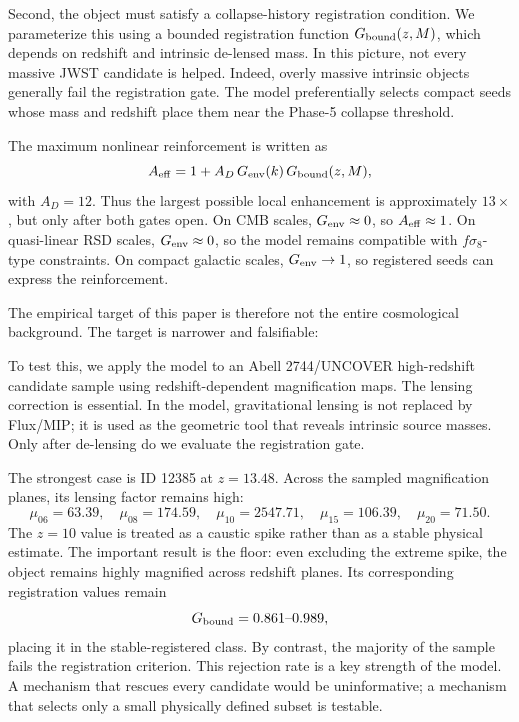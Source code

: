 \documentclass[11pt,a4paper]{article}
\begin{document}
Second, the object must satisfy a collapse-history registration condition. We parameterize this using a bounded registration function $G_{\rm bound}(z,M)$, which depends on redshift and intrinsic de-lensed mass. In this picture, not every massive JWST candidate is helped. Indeed, overly massive intrinsic objects generally fail the registration gate. The model preferentially selects compact seeds whose mass and redshift place them near the Phase-5 collapse threshold.

The maximum nonlinear reinforcement is written as
\begin{equation}
A_{\rm eff}=1+A_D\,G_{\rm env}(k)\,G_{\rm bound}(z,M),
\end{equation}
with $A_D=12$. Thus the largest possible local enhancement is approximately $13\times$, but only after both gates open. On CMB scales, $G_{\rm env}\approx0$, so $A_{\rm eff}\approx1$. On quasi-linear RSD scales, $G_{\rm env}\approx0$, so the model remains compatible with $f\sigma_8$-type constraints. On compact galactic scales, $G_{\rm env}\rightarrow1$, so registered seeds can express the reinforcement.

The empirical target of this paper is therefore not the entire cosmological background. The target is narrower and falsifiable:
\begin{center}
\end{center}

To test this, we apply the model to an Abell 2744/UNCOVER high-redshift candidate sample using redshift-dependent magnification maps. The lensing correction is essential. In the model, gravitational lensing is not replaced by Flux/MIP; it is used as the geometric tool that reveals intrinsic source masses. Only after de-lensing do we evaluate the registration gate.

The strongest case is ID 12385 at $z=13.48$. Across the sampled magnification planes, its lensing factor remains high:
\begin{equation}
\mu_{06}=63.39,\quad
\mu_{08}=174.59,\quad
\mu_{10}=2547.71,\quad
\mu_{15}=106.39,\quad
\mu_{20}=71.50.
\end{equation}
The $z=10$ value is treated as a caustic spike rather than as a stable physical estimate. The important result is the floor: even excluding the extreme spike, the object remains highly magnified across redshift planes. Its corresponding registration values remain
\begin{equation}
G_{\rm bound}=0.861\text{--}0.989,
\end{equation}
placing it in the stable-registered class. By contrast, the majority of the sample fails the registration criterion. This rejection rate is a key strength of the model. A mechanism that rescues every candidate would be uninformative; a mechanism that selects only a small physically defined subset is testable.
\end{document}
